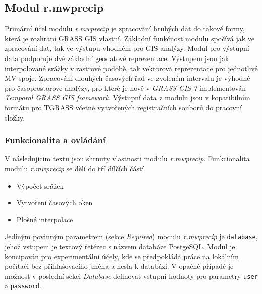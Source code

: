 \documentclass[a4paper,12pt,oneside]{report}
\begin{document}
\subsection{Modul r.mwprecip}
Primární účel  modulu \textit{r.mwprecip} je zpracování hrubých dat do takové formy, která je rozhraní GRASS GIS vlastní. Základní funkčnost modulu spočívá jak ve zpracování dat, tak ve výstupu vhodném pro GIS analýzy. Modul pro výstupní data podporuje dvě základní geodatové reprezentace. Výstupem jsou jak interpolované srážky v rastrové podobě, tak vektorová reprezentace pro jednotlivé MV spoje. 
Zpracování dlouhých časových řad ve zvoleném intervalu je výhodné pro časoprostorové analýzy, pro které je nově v \textit{GRASS GIS 7} implementován \textit{Temporal GRASS GIS framework}. Výstupní data z modulu jsou v kopatibilním formátu pro TGRASS včetné vytvořených registračních souborů do pracovní složky.

 
\subsubsection{Funkcionalita a ovládání}
V následujícím textu jsou shrnuty vlastnosti modulu \textit{r.mwprecip}. Funkcionalita modulu \textit{r.mwprecip} se dělí do tří dílčích částí.

\begin{itemize}
\item Výpočet srážek
\item Vytvoření časových oken
\item Plošné interpolace 
\end{itemize}

Jediným povinným parametrem (sekce \textit{Required}) modulu \textit{r.mwprecip} je \texttt{database}, jehož vstupem je textový řetězec  s názvem databáze PostgeSQL. Modul je koncipován pro experimentální účely, kde se předpokládá práce na lokálním počítači bez přihlašovacího jména a hesla k databázi. V opačné případě je možnost v poslední sekci \textit{Database} definovat vstupní hodnoty pro parametry \texttt{user} a \texttt{password}. 
\end{document}
